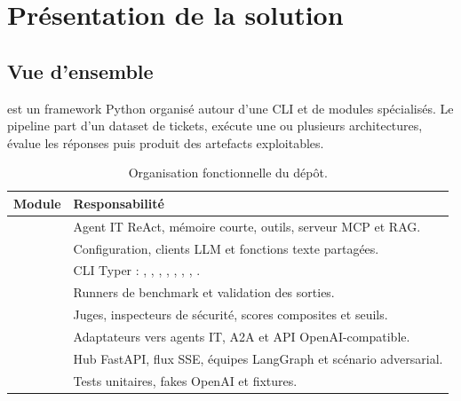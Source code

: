
\chapter{Présentation de la solution}

\section{Vue d'ensemble}

\bibopsname{} est un framework Python organisé autour d'une CLI et de modules
spécialisés. Le pipeline part d'un dataset de tickets, exécute une ou plusieurs
architectures, évalue les réponses puis produit des artefacts exploitables.


\begin{table}[!htbp]
\centering
\begin{tabularx}{\textwidth}{lY}
\toprule
\textbf{Module} & \textbf{Responsabilité} \\
\midrule
{} & Agent IT ReAct, mémoire courte, outils, serveur MCP et RAG. \\
 & Configuration, clients LLM et fonctions texte partagées. \\
 & CLI Typer : , , , , , , , . \\
 & Runners de benchmark et validation des sorties. \\
 & Juges, inspecteurs de sécurité, scores composites et seuils. \\
 & Adaptateurs vers agents IT, A2A et API OpenAI-compatible. \\
 & Hub FastAPI, flux SSE, équipes LangGraph et scénario adversarial. \\
 & Tests unitaires, fakes OpenAI et fixtures. \\
\bottomrule
\end{tabularx}
\caption{Organisation fonctionnelle du dépôt.}
\label{tab:repo-layout}
\end{table}

